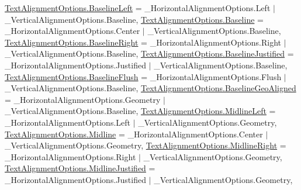 \begin{DoxyCompactItemize}
\mbox{\hyperlink{namespace_t_m_pro_a1dd743b58b1fd4057c00e4b98ab86301af95036b6ede3e38bb9a601ed594e188c}{Text\+Alignment\+Options.\+Baseline\+Left}} = \+\_\+\+Horizontal\+Alignment\+Options.\+Left $\vert$ \+\_\+\+Vertical\+Alignment\+Options.\+Baseline, 
\mbox{\hyperlink{namespace_t_m_pro_a1dd743b58b1fd4057c00e4b98ab86301aa4a32c4764653e50488bff6ce2eb815b}{Text\+Alignment\+Options.\+Baseline}} = \+\_\+\+Horizontal\+Alignment\+Options.\+Center $\vert$ \+\_\+\+Vertical\+Alignment\+Options.\+Baseline, 
\newline
\mbox{\hyperlink{namespace_t_m_pro_a1dd743b58b1fd4057c00e4b98ab86301addbf9886f6c9784665263633fc60fac9}{Text\+Alignment\+Options.\+Baseline\+Right}} = \+\_\+\+Horizontal\+Alignment\+Options.\+Right $\vert$ \+\_\+\+Vertical\+Alignment\+Options.\+Baseline, 
\mbox{\hyperlink{namespace_t_m_pro_a1dd743b58b1fd4057c00e4b98ab86301a9f5784ecde22f25983b832003fb83d19}{Text\+Alignment\+Options.\+Baseline\+Justified}} = \+\_\+\+Horizontal\+Alignment\+Options.\+Justified $\vert$ \+\_\+\+Vertical\+Alignment\+Options.\+Baseline, 
\mbox{\hyperlink{namespace_t_m_pro_a1dd743b58b1fd4057c00e4b98ab86301a283621649cebbd166fa99c0a0142640a}{Text\+Alignment\+Options.\+Baseline\+Flush}} = \+\_\+\+Horizontal\+Alignment\+Options.\+Flush $\vert$ \+\_\+\+Vertical\+Alignment\+Options.\+Baseline, 
\mbox{\hyperlink{namespace_t_m_pro_a1dd743b58b1fd4057c00e4b98ab86301ab8bf5ae865b07db8dcac38413bb5af7b}{Text\+Alignment\+Options.\+Baseline\+Geo\+Aligned}} = \+\_\+\+Horizontal\+Alignment\+Options.\+Geometry $\vert$ \+\_\+\+Vertical\+Alignment\+Options.\+Baseline, 
\newline
\mbox{\hyperlink{namespace_t_m_pro_a1dd743b58b1fd4057c00e4b98ab86301aa411c07b553ad36673079bdd7bcbf30b}{Text\+Alignment\+Options.\+Midline\+Left}} = \+\_\+\+Horizontal\+Alignment\+Options.\+Left $\vert$ \+\_\+\+Vertical\+Alignment\+Options.\+Geometry, 
\mbox{\hyperlink{namespace_t_m_pro_a1dd743b58b1fd4057c00e4b98ab86301a1c7bd56dd61904001bac69c31a9c2435}{Text\+Alignment\+Options.\+Midline}} = \+\_\+\+Horizontal\+Alignment\+Options.\+Center $\vert$ \+\_\+\+Vertical\+Alignment\+Options.\+Geometry, 
\mbox{\hyperlink{namespace_t_m_pro_a1dd743b58b1fd4057c00e4b98ab86301ac1847ed7e3b28b9cdff93d135332ecb2}{Text\+Alignment\+Options.\+Midline\+Right}} = \+\_\+\+Horizontal\+Alignment\+Options.\+Right $\vert$ \+\_\+\+Vertical\+Alignment\+Options.\+Geometry, 
\mbox{\hyperlink{namespace_t_m_pro_a1dd743b58b1fd4057c00e4b98ab86301adb2888b8824217a4454cd188e2c760e5}{Text\+Alignment\+Options.\+Midline\+Justified}} = \+\_\+\+Horizontal\+Alignment\+Options.\+Justified $\vert$ \+\_\+\+Vertical\+Alignment\+Options.\+Geometry, 

\end{DoxyCompactItemize}
